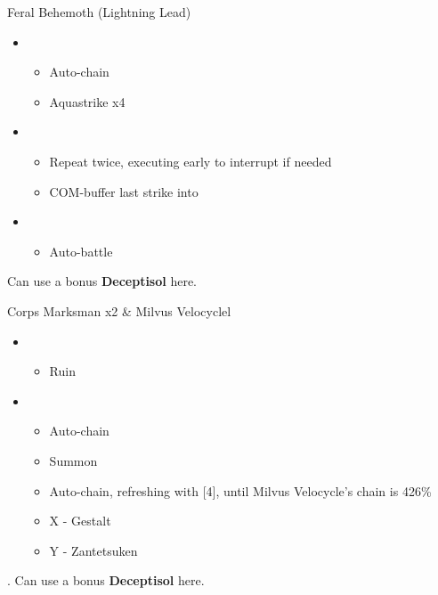 \begin{paracol}{2}
\begin{battle}{Feral Behemoth (Lightning Lead)}
\begin{itemize}
\begin{itemize}
			      \end{itemize}
			\item \fourth
			      \begin{itemize}
				      \item Auto-chain
				      \item Aquastrike x4
			      \end{itemize}
			\item \fifth
			      \begin{itemize}
				      \item Repeat twice, executing early to interrupt if needed
				      \item COM-buffer last strike into
			      \end{itemize}
			\item \first
			      \begin{itemize}
				      \item Auto-battle
			      \end{itemize}
		\end{itemize}
	\end{battle}
	\switchcolumn*
	  Can use a bonus \textbf{Deceptisol} here.

	\begin{battle}{Corps Marksman x2 \& Milvus Velocyclel}

		\begin{itemize}
			\item \first
			      \begin{itemize}
				      \item Ruin
			      \end{itemize}
			\item \fifth
			      \begin{itemize}
				      \item Auto-chain
				      \item Summon
				      \item Auto-chain, refreshing with [4], until Milvus Velocycle's chain is 426\%
				      \item X - Gestalt
				      \item Y - Zantetsuken
			      \end{itemize}
		\end{itemize}
	\end{battle}
	\switchcolumn
	 . Can use a bonus \textbf{Deceptisol} here.


\end{paracol}
